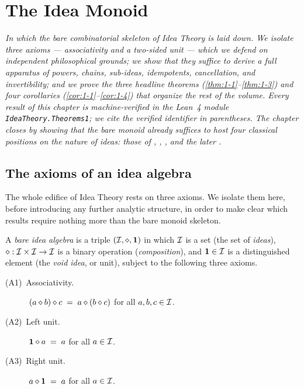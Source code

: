 \chapter{The Idea Monoid}\label{ch:monoid}

\emph{In which the bare combinatorial skeleton of Idea Theory is laid down.
We isolate three axioms --- associativity and a two-sided unit --- which we
defend on independent philosophical grounds; we show that they suffice to
derive a full apparatus of powers, chains, sub-ideas, idempotents,
cancellation, and invertibility; and we prove the three headline theorems
(\ref{thm:1-1}--\ref{thm:1-3}) and four corollaries
(\ref{cor:1-1}--\ref{cor:1-4}) that organize the rest of the volume.  Every
result of this chapter is machine-verified in the Lean~4 module
\texttt{IdeaTheory.Theorems1}; we cite the verified identifier in
parentheses.  The chapter closes by showing that the bare monoid already
suffices to host four classical positions on the nature of ideas: those of
\cite{Locke1690}, \cite{Hume1739}, \cite{Frege1892}, and the later
\cite{Wittgenstein1953}.}

\section{The axioms of an idea algebra}\label{sec:axioms}

The whole edifice of Idea Theory rests on three axioms.  We isolate them
here, before introducing any further analytic structure, in order to make
clear which results require nothing more than the bare monoid skeleton.

\begin{definition}\label{def:idea-algebra}
A \emph{bare idea algebra} is a triple $(\mathcal{I},\mathbin{\diamond},\mathbf{1})$ in which $\mathcal{I}$ is a set
(the set of \emph{ideas}), $\mathbin{\diamond} : \mathcal{I} \times \mathcal{I} \to \mathcal{I}$ is
a binary operation (\emph{composition}), and $\mathbf{1} \in \mathcal{I}$ is a
distinguished element (the \emph{void idea}, or unit), subject to the
following three axioms.
\begin{description}
\item[(A1)\ Associativity.]
$(a \mathbin{\diamond} b) \mathbin{\diamond} c \;=\; a \mathbin{\diamond} (b \mathbin{\diamond} c)$ for all
$a,b,c \in \mathcal{I}$.
\item[(A2)\ Left unit.]
$\mathbf{1} \mathbin{\diamond} a \;=\; a$ for all $a \in \mathcal{I}$.
\item[(A3)\ Right unit.]
$a \mathbin{\diamond} \mathbf{1} \;=\; a$ for all $a \in \mathcal{I}$.
\end{description}
\end{definition}

